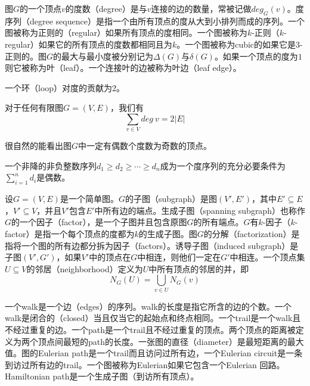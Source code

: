 \begin{definition}[度数]
	图$G$的一个顶点$v$的度数（degree）是与$v$连接的边的数量，常被记做$deg_G(v)$。度序列（degree sequence）是指一个由所有顶点的度从大到小排列而成的序列。一个图被称为正则的（regular）如果所有顶点的度相同。一个图被称为$k$-正则（$k$-regular）如果它的所有顶点的度数都相同且为$k$。一个图被称为cubic的如果它是3-正则的。图$G$的最大与最小度被分别记为$\Delta(G)$与$\delta(G)$。如果一个顶点的度为$1$则它被称为叶（leaf）。一个连接叶的边被称为叶边（leaf edge）。
\end{definition}
\begin{note}
	一个环（loop）对度的贡献为$2$。
\end{note}
\begin{theorem}
	对于任何有限图$G = (V, E)$，我们有
	\begin{equation*}
		\sum\limits_{v\in V} deg\ v = 2|E|
	\end{equation*}
\end{theorem}
\begin{note}
	很自然的能看出图$G$中一定有偶数个度数为奇数的顶点。
\end{note}
\begin{theorem}
	一个非降的非负整数序列$d_1\geq d_2\geq \cdots \geq d_n$成为一个度序列的充分必要条件为$\sum\limits_{i=1}^n d_i$是偶数。
\end{theorem}
\begin{definition}
	设$G = (V, E)$是一个简单图。$G$的子图（subgraph）是图$(V', E')$，其中$E'\subseteq E$，$V'\subseteq V$，并且$V'$包含$E'$中所有边的端点。生成子图（spanning subgraph）也称作$G$的一个因子（factor），是一个子图并且包含原图$G$的所有端点。$G$有$k$-因子（$k$-factor）是指一个每个顶点的度都为$k$的生成子图。图$G$的分解（factorization）是指将一个图的所有边都分拆为因子（factors）。诱导子图（induced subgraph）是子图$(V', G')$，如果$V'$中的顶点在$G$中相连，则他们一定在$G'$中相连。一个顶点集$U\subseteq V$的邻居（neighborhood）定义为$U$中所有顶点的邻居的并，即
	\begin{equation*}
		N_G(U) = \bigcup\limits_{v\in U}N_G(v)
	\end{equation*}
\end{definition}
\begin{definition}
	一个walk是一个边（edges）的序列。walk的长度是指它所含的边的个数。一个walk是闭合的（closed）当且仅当它的起始点和终点相同。一个trail是一个walk且不经过重复的边。一个path是一个trail且不经过重复的顶点。两个顶点的距离被定义为两个顶点间最短的path的长度。一张图的直径（diameter）是最短距离的最大值。图的Eulerian path是一个trail而且访问过所有边，一个Eulerian circuit是一条到访过所有边的trail。一个图被称为Eulerian如果它包含一个Eulerian 回路。Hamiltonian path是一个生成子图（到访所有顶点）。
\end{definition}
